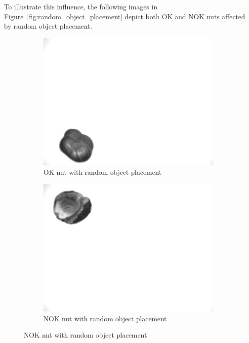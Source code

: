 \documentclass[12pt,DIV14,BCOR12mm,a4paper,footinclude=false,headinclude,parskip=half-,twoside,openright,cleardoublepage=empty,toc=index,bibliography=totoc,listof=totoc]{scrreprt}
\numberwithin{equation}{chapter}
\begin{document}
\begin{enumerate}
	To illustrate this influence, the following images in Figure~\ref{fig:random_object_placement} depict both OK and NOK nuts affected by random object placement.

	\begin{figure}
		\centering
		\begin{subfigure}[b]{0.45\textwidth}
			\centering
			\includegraphics[scale=0.15]{../media/Nuts-influence-random-OK.png}
			\caption{OK nut with random object placement}
		\end{subfigure}
		\hfill
		\begin{subfigure}[b]{0.45\textwidth}
			\centering
			\includegraphics[scale=0.15]{../media/Nuts-influence-random-NOK.png}
			\caption{NOK nut with random object placement}

\end{subfigure}
\end{figure}
\end{enumerate}
\end{document}
